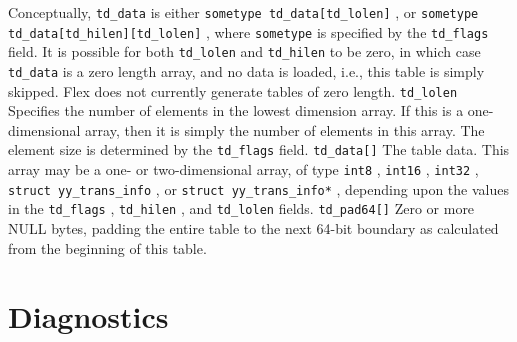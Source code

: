 \documentclass[openany,oneside]{book}
\begin{document}
Conceptually, \verb`td_data` is either \verb`sometype td_data[td_lolen]` , or \verb`sometype td_data[td_hilen][td_lolen]` , where \verb`sometype` is specified
by the \verb`td_flags` field.  It is possible for both \verb`td_lolen` and \verb`td_hilen` to be zero, in which case \verb`td_data` is a zero length
array, and no data is loaded, i.e., this table is simply skipped. Flex does not
currently generate tables of zero length. \verb`td_lolen` Specifies the number of elements in the lowest dimension array. If this is
a one-dimensional array, then it is simply the number of elements in this array. 
The element size is determined by the \verb`td_flags` field. \verb`td_data[]` The table data. This array may be a one- or two-dimensional array, of type \verb`int8` , \verb`int16` , \verb`int32` , \verb`struct yy_trans_info` , or \verb`struct yy_trans_info*` ,  depending upon the values in the \verb`td_flags` , \verb`td_hilen` , and \verb`td_lolen` fields. \verb`td_pad64[]` Zero or more NULL bytes, padding the entire table to the next 64-bit boundary as
calculated from the beginning of this table.
\chapter{Diagnostics}
\end{document}
